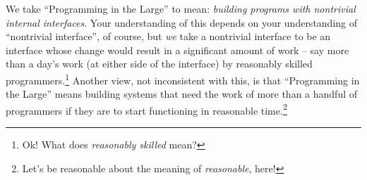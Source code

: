 \documentclass{ip3}
\begin{document}



\begin{foil}

\begin{note}
      We take ``Programming in the Large'' to mean: \textit{building
      programs with nontrivial internal interfaces}. Your understanding of
      this depends on your understanding of ``nontrivial interface'', of
      course, but \textit{we} take a nontrivial interface to be an
      interface whose change would result in a significant amount of work
      -- say more than a day's work (at either side of the interface) by
      reasonably skilled programmers.\footnote{Ok! What does
      \textit{reasonably skilled} mean?} Another view, not inconsistent
      with this, is that ``Programming in the Large'' means building
      systems that need the work of more than a handful of programmers if
      they are to start functioning in reasonable time.\footnote{Let's be
      reasonable about the meaning of \textit{reasonable}, here!}

\end{note}


\end{foil}
\end{document}
